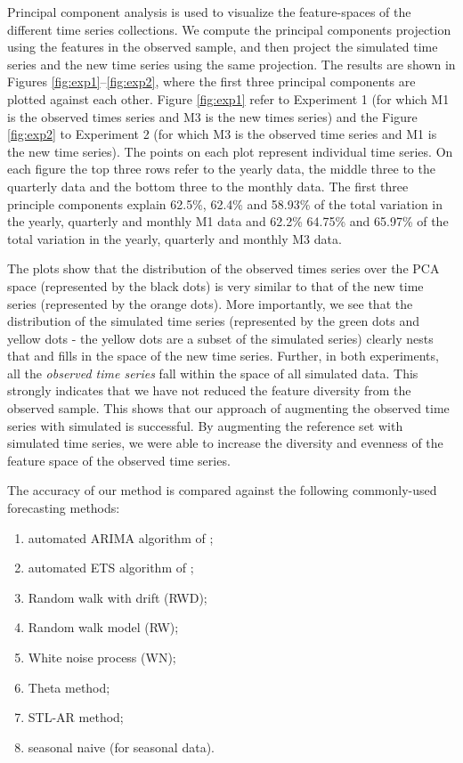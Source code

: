 \documentclass[11pt,a4paper,]{article}
\providecommand{\tightlist}{%
  \setlength{\itemsep}{0pt}\setlength{\parskip}{0pt}}
\theoremstyle{definition}
\theoremstyle{definition}
\theoremstyle{definition}
\theoremstyle{remark}
\begin{document}
Principal component analysis is used to visualize the feature-spaces of
the different time series collections. We compute the principal
components projection using the features in the observed sample, and
then project the simulated time series and the new time series using the
same projection. The results are shown in Figures
\ref{fig:exp1}--\ref{fig:exp2}, where the first three principal
components are plotted against each other. Figure \ref{fig:exp1} refer
to Experiment 1 (for which M1 is the observed times series and M3 is the
new times series) and the Figure \ref{fig:exp2} to Experiment 2 (for
which M3 is the observed time series and M1 is the new time series). The
points on each plot represent individual time series. On each figure the
top three rows refer to the yearly data, the middle three to the
quarterly data and the bottom three to the monthly data. The first three
principle components explain 62.5\%, 62.4\% and 58.93\% of the total
variation in the yearly, quarterly and monthly M1 data and 62.2\%
64.75\% and 65.97\% of the total variation in the yearly, quarterly and
monthly M3 data.

The plots show that the distribution of the observed times series over
the PCA space (represented by the black dots) is very similar to that of
the new time series (represented by the orange dots). More importantly,
we see that the distribution of the simulated time series (represented
by the green dots and yellow dots - the yellow dots are a subset of the
simulated series) clearly nests that and fills in the space of the new
time series. Further, in both experiments, all the \emph{observed time
series} fall within the space of all simulated data. This strongly
indicates that we have not reduced the feature diversity from the
observed sample. This shows that our approach of augmenting the observed
time series with simulated is successful. By augmenting the reference
set with simulated time series, we were able to increase the diversity
and evenness of the feature space of the observed time series.

The accuracy of our method is compared against the following
commonly-used forecasting methods:

\begin{enumerate}
\def\labelenumi{\arabic{enumi}.}
\tightlist
\item
  automated ARIMA algorithm of \textcite{Hyndman2008};
\item
  automated ETS algorithm of \textcite{Hyndman2008};
\item
  Random walk with drift (RWD);
\item
  Random walk model (RW);
\item
  White noise process (WN);
\item
  Theta method;
\item
  STL-AR method;
\item
  seasonal naive (for seasonal data).
\end{enumerate}
\end{document}

